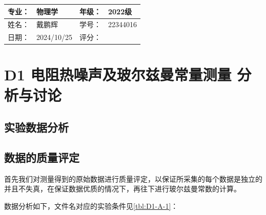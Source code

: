 \documentclass[dvipsnames, svgnames,a4paper,11pt]{article}
\begin{document}
\clearpage
\begin{table}
	\renewcommand\arraystretch{1.7}
	\begin{tabularx}{\textwidth}{|X|X|X|X|}
	\hline
	专业：& 物理学 &年级：& 2022级\\
	\hline
	姓名： & 戴鹏辉 & 学号：& 22344016\\
	\hline
    日期：& 2024/10/25 & 评分： &\\
	\hline
	\end{tabularx}
\end{table}

\section{D1 \quad 电阻热噪声及玻尔兹曼常量测量 \quad\heiti 分析与讨论}

\subsection{实验数据分析}

	\subsection{数据的质量评定}

		首先我们对测量得到的原始数据进行质量评定，以保证所采集的每个数据是独立的并且不失真，在保证数据优质的情况下，再往下进行玻尔兹曼常数的计算。

		数据分析如下，文件名对应的实验条件见\cref{tbl:D1-A-1}：
			
\end{document}
